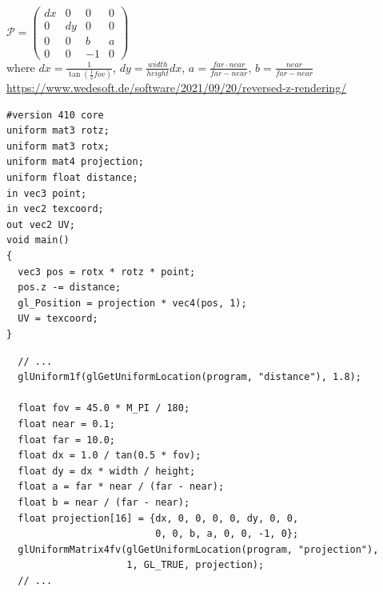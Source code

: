 \documentclass[calcdimensions,landscape,letterpaper]{powersem}
\newcommand{\thecurrentheading}{}
\newcommand{\heading}[1]{\renewcommand{\thecurrentheading}{#1}}
\begin{document}
\begin{slide}
\begin{center}
\begin{minipage}[c]{.45\textwidth}
        \end{minipage}\vspace{-16pt}\\
        $\mathcal{P}=
         \begin{pmatrix}
            dx & 0  &  0 & 0\\
            0  & dy &  0 & 0\\
            0  & 0  &  b & a\\
            0  & 0  & -1 & 0
        \end{pmatrix}$\medskip\\
        where
        $dx=\frac{1}{\tan(\frac{1}{2}fov)}$,
        $dy=\frac{width}{height}dx$,
        $a=\frac{far\cdot near}{far-near}$,
        $b=\frac{near}{far-near}$\bigskip\\
        \url{https://www.wedesoft.de/software/2021/09/20/reversed-z-rendering/}
    \end{center}
\end{slide}

\begin{slide}
    \heading{Shader with Translation and Projection}
    \begin{center}
        \begin{minipage}[c]{.65\textwidth}
            \begin{verbatim}
#version 410 core
uniform mat3 rotz;
uniform mat3 rotx;
uniform mat4 projection;
uniform float distance;
in vec3 point;
in vec2 texcoord;
out vec2 UV;
void main()
{
  vec3 pos = rotx * rotz * point;
  pos.z -= distance;
  gl_Position = projection * vec4(pos, 1);
  UV = texcoord;
}
            \end{verbatim}
        \end{minipage}
    \end{center}
\end{slide}

\begin{slide}
    \heading{Uniform Distance and Projection Matrix}
    \begin{center}
        \begin{minipage}[c]{.95\textwidth}
            \begin{verbatim}
  // ...
  glUniform1f(glGetUniformLocation(program, "distance"), 1.8);

  float fov = 45.0 * M_PI / 180;
  float near = 0.1;
  float far = 10.0;
  float dx = 1.0 / tan(0.5 * fov);
  float dy = dx * width / height;
  float a = far * near / (far - near);
  float b = near / (far - near);
  float projection[16] = {dx, 0, 0, 0, 0, dy, 0, 0,
                          0, 0, b, a, 0, 0, -1, 0};
  glUniformMatrix4fv(glGetUniformLocation(program, "projection"),
                     1, GL_TRUE, projection);
  // ...
            \end{verbatim}
        \end{minipage}
    \end{center}
\end{slide}
\end{document}
